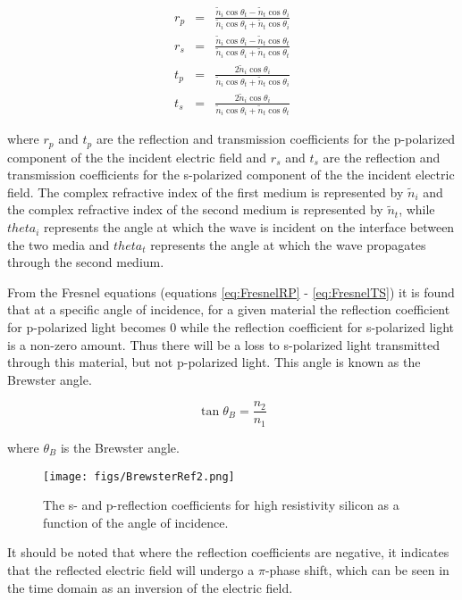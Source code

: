 \begin{eqnarray}
r_{p} &=& \frac{\widetilde{n}_{i}\cos{\theta_{t}} - \widetilde{n}_{t}\cos{\theta_{i}}}{\widetilde{n}_{i}\cos{\theta_{t}} + \widetilde{n}_{t}\cos{\theta_{i}}}\label{eq:FresnelRP}\\
r_{s} &=& \frac{\widetilde{n}_{i}\cos{\theta_{i}} - \widetilde{n}_{t}\cos{\theta_{t}}}{\widetilde{n}_{i}\cos{\theta_{i}} + \widetilde{n}_{t}\cos{\theta_{t}}}\label{eq:FresnelRS}\\
t_{p} &=& \frac{2\widetilde{n}_{i}\cos{\theta_{i}}}{\widetilde{n}_{i}\cos{\theta_{t}} + \widetilde{n}_{t}\cos{\theta_{i}}}\label{eq:FresnelTP}\\
t_{s} &=& \frac{2\widetilde{n}_{i}\cos{\theta_{i}}}{\widetilde{n}_{i}\cos{\theta_{i}} + \widetilde{n}_{t}\cos{\theta_{t}}}\label{eq:FresnelTS}
\end{eqnarray}

where $r_{p}$ and $t_{p}$ are the reflection and transmission coefficients for the p-polarized component of the the incident electric field and $r_{s}$ and $t_{s}$ are the reflection and transmission coefficients for the s-polarized component of the the incident electric field. The complex refractive index of the first medium is represented by $\widetilde{n}_{i}$ and the complex refractive index of the second medium is represented by $\widetilde{n}_{t}$, while $theta_{i}$ represents the angle at which the wave is incident on the interface between the two media and $theta_{t}$ represents the angle at which the wave propagates through the second medium.

From the Fresnel equations (equations \ref{eq:FresnelRP} - \ref{eq:FresnelTS}) it is found that at a specific angle of incidence, for a given material
the reflection coefficient for p-polarized light becomes $0$ while the reflection coefficient for s-polarized light is a non-zero amount. Thus there will be a loss to s-polarized light transmitted through this material, but not p-polarized light. This angle is known as the Brewster angle.

\begin{equation}
\tan{\theta_{B}} = \frac{n_{2}}{n_{1}}
\label{eq:Brewster}
\end{equation}

where $\theta_{B}$ is the Brewster angle.\cite{Griffiths-2008}

\begin{figure}[H]
\begin{center}
	 \texttt{[image: figs/BrewsterRef2.png]}
	 \caption{The s- and p-reflection coefficients for high resistivity silicon as a function of the angle of incidence.}
   \label{fig:BrewRef}
\end{center}
\end{figure}
It should be noted that where the reflection coefficients are negative, it indicates that the reflected electric field will undergo a $\pi$-phase shift, which can be seen in the time domain as an inversion of the electric field.

